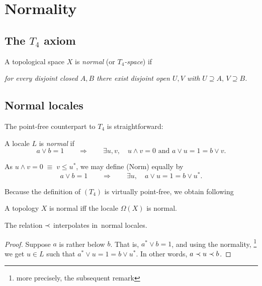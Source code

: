 \chapter{Normality}

\section{The $T_4$ axiom}

\begin{framed}
  \begin{df}[$T_4$]
    A topological space $X$ is \emph{normal\/} (or \emph{$T_4$-space\/}) if
    \begin{center} \it
      for every disjoint closed $A, B$ there exist disjoint open $U, V$ with
      $U\supseteq A, \, V\supseteq B$.
    \end{center}
  \end{df}
\end{framed}

\section{Normal locales}

The point-free counterpart to $T_4$ is straightforward:

\begin{framed}
  \begin{df}[Norm]
    A locale $L$ is \emph{normal\/} if
    \[
      a \vee b = 1 \qquad \Rightarrow \qquad \exists u, v, \quad u \wedge v =
      0 \text{ and } a \vee u = 1 = b \vee v.
    \]
  \end{df}
\end{framed}

\begin{rem}
  As $u \wedge v = 0 \; \equiv \; v \le u^*$, we may define (Norm) equally by
  \[
    a \vee b = 1 \qquad \Rightarrow \qquad \exists u, \quad a \vee u = 1 = b
    \vee u^*.
  \]
\end{rem}

\medskip

Because the definition of $(T_4)$ is virtually point-free, we obtain following

\begin{cor}
  A topology $X$ is normal iff the locale $\Omega(X)$ is normal.
\end{cor}

\begin{lem}
  The relation $\prec$ interpolates in~normal locales.
\end{lem}
\begin{proof}
  Suppose $a$ is rather below $b$.
  That is, $a^* \vee b = 1$, and using the normality,\thinspace%
  \footnote{more precisely, the subsequent remark}
  we get $u\in L$ such that
  $a^* \vee u = 1 = b \vee u^*$.
  In other words, $a \prec u \prec b$.
\end{proof}

